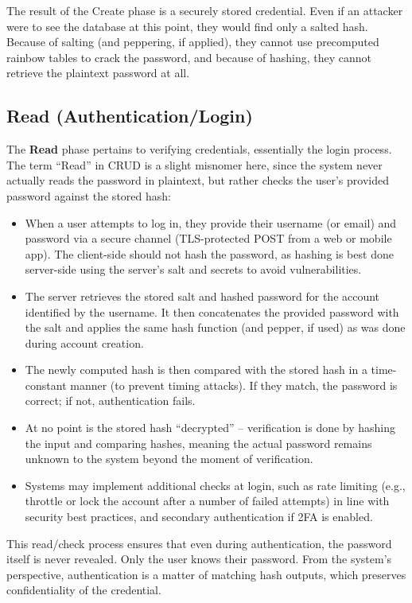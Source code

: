 \documentclass[11pt]{article}
\begin{document}
The result of the Create phase is a securely stored credential. Even if an attacker were to see the database at this point, they would find only a salted hash. Because of salting (and peppering, if applied), they cannot use precomputed rainbow tables to crack the password, and because of hashing, they cannot retrieve the plaintext password at all.

\subsection{Read (Authentication/Login)}
The \textbf{Read} phase pertains to verifying credentials, essentially the login process. The term “Read” in CRUD is a slight misnomer here, since the system never actually reads the password in plaintext, but rather checks the user’s provided password against the stored hash:
\begin{itemize}
    \item When a user attempts to log in, they provide their username (or email) and password via a secure channel (TLS-protected POST from a web or mobile app). The client-side should not hash the password, as hashing is best done server-side using the server’s salt and secrets to avoid vulnerabilities.
    \item The server retrieves the stored salt and hashed password for the account identified by the username. It then concatenates the provided password with the salt and applies the same hash function (and pepper, if used) as was done during account creation.
    \item The newly computed hash is then compared with the stored hash in a time-constant manner (to prevent timing attacks). If they match, the password is correct; if not, authentication fails.
    \item At no point is the stored hash “decrypted” – verification is done by hashing the input and comparing hashes, meaning the actual password remains unknown to the system beyond the moment of verification.
    \item Systems may implement additional checks at login, such as rate limiting (e.g., throttle or lock the account after a number of failed attempts) in line with security best practices, and secondary authentication if 2FA is enabled.
\end{itemize}

This read/check process ensures that even during authentication, the password itself is never revealed. Only the user knows their password. From the system’s perspective, authentication is a matter of matching hash outputs, which preserves confidentiality of the credential.
\end{document}
